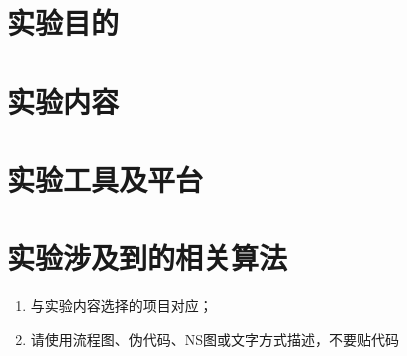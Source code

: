 \documentclass[lang=cn,11pt,a4paper,cite=super]{whureport}
\begin{document}
\makeheader



\section{实验目的}



\section{实验内容}



\section{实验工具及平台}




\section{实验涉及到的相关算法}
{\kaishu \begin{enumerate}
	\item 与实验内容选择的项目对应；
	\item 请使用流程图、伪代码、NS图或文字方式描述，不要贴代码
\end{enumerate}}
\end{document}

